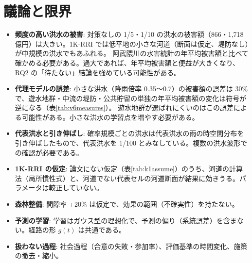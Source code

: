 \documentclass[a4paper,10pt]{ltjsarticle}
\begin{document}
\section{議論と限界}
\label{sec:limits}
\begin{itemize}
  \item \textbf{頻度の高い洪水の被害}: 対策なしの 1/5・1/10 の洪水の被害額（866・1,718 億円）は大きい。1K-RRI では低平地の小さな河道（断面は仮定、堤防なし）が中規模の洪水でもあふれる。
    阿武隈川の水害統計の年平均被害額と比べて確かめる必要がある。過大であれば、年平均被害額と便益が大きくなり、RQ2 の「待たない」結論を強めている可能性がある。
  \item \textbf{代理モデルの誤差}: 小さな洪水（降雨倍率 0.35〜0.7）の被害額の誤差は 30\% で、遊水地群・中流の堤防・公共貯留の単独の年平均被害額の変化は符号が逆になる（表\ref{tab:v6measures}）。
    遊水地群が選ばれにくいのはこの誤差による可能性がある。小さな洪水の学習点を増やす必要がある。
  \item \textbf{代表洪水と引き伸ばし}: 確率規模ごとの洪水は代表洪水の雨の時空間分布を引き伸ばしたもので、代表洪水を 1/100 とみなしている。複数の洪水波形での確認が必要である。
  \item \textbf{1K-RRI の仮定}: 論文にない仮定（表\ref{tab:k1assume}）のうち、河道の計算法（局所慣性式）と、河道でない代表セルの河道断面が結果に効きうる。パラメータは較正していない。
  \item \textbf{森林整備}: 間隙率 +20\% は仮定で、効果の範囲（不確実性）を持たない。
  \item \textbf{予測の学習}: 学習はガウス型の理想化で、予測の偏り（系統誤差）を含まない。経路の形 $g(t)$ は共通である。
  \item \textbf{扱わない過程}: 社会過程（合意の失敗・参加率）、評価基準の時間変化、施策の撤去・縮小。
\end{itemize}

\end{document}
